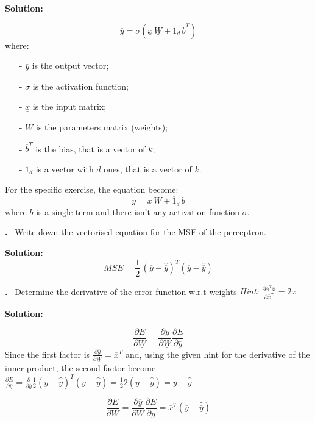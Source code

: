 \documentclass[12pt]{article}
\newcounter{problem}
\newcounter{solution}
\newcommand\Problem{%
	\stepcounter{problem}%
	\textbf{\theproblem.}~%
	\setcounter{solution}{0}%
}
\newcommand\Solution{%
	\textbf{Solution:}\\%
}
\begin{document}
\Solution{
	\begin{equation}
	\overline{y}=\sigma(\underline{x} \, \underline{W}+\overline{1}_d \, \overline{b}^T)
	\end{equation}
where:\begin{itemize}\itemsep-0.7em 
		\item[-] $\overline{y}$ is the output vector; \\
		\item[-] $\sigma$ is the activation function; \\
		\item[-] $\underline{x}$ is the input matrix; \\
		\item[-] $\underline{W}$ is the parameters matrix (weights); \\
		\item[-] $\overline{b}^T$ is the bias, that is a vector of $k$; \\
		\item[-] $\overline{1}_d$ is a vector  with $d$ ones, that is a vector of $k$.
\end{itemize}
For the specific exercise, the equation become:
	\begin{equation}
	\overline{y}=\underline{x} \, \underline{W}+\overline{1}_d \, b
	\end{equation}
	where $b$ is a single term and there isn't any activation function $\sigma$.
}

\Problem{Write down the vectorised equation for the MSE of the perceptron.}

\Solution{	
	\begin{equation}
	MSE = \frac{1}{2} \, (\overline{y}-\hat{\overline{y}})^T(\overline{y}-\hat{\overline{y}})
	\end{equation}}

\Problem{Determine the derivative of the error function w.r.t weights \textit{Hint: $\frac{\partial \overline{x}^T\overline{x}}{\partial\overline{x}^T} = 2\overline{x}$}}

\Solution{	
	\begin{equation}
	 \frac{\partial E}{\partial \underline{W}}= \frac{\partial \overline{y}}{\partial \underline{W}}\frac{\partial E}{\partial \overline{y}}
	\end{equation}
	Since the first factor is $\frac{\partial \overline{y}}{\partial \underline{W}}=\overline{x}^T$ and, using the given hint for the derivative of the inner product, the second factor become $\frac{\partial E}{\partial \overline{y}} = \frac{\partial }{\partial \overline{y}} \frac{1}{2}(\overline{y}-\hat{\overline{y}})^T(\overline{y}-\hat{\overline{y}}) = \frac{1}{2}2(\overline{y}-\hat{\overline{y}})=\overline{y}-\hat{\overline{y}}$
	
	 
	\begin{equation}
		 \frac{\partial E}{\partial \underline{W}}= \frac{\partial \overline{y}}{\partial \underline{W}}\frac{\partial E}{\partial \overline{y}} = \overline{x}^T(\overline{y}-\hat{\overline{y}})
	\end{equation}
}
\end{document}
